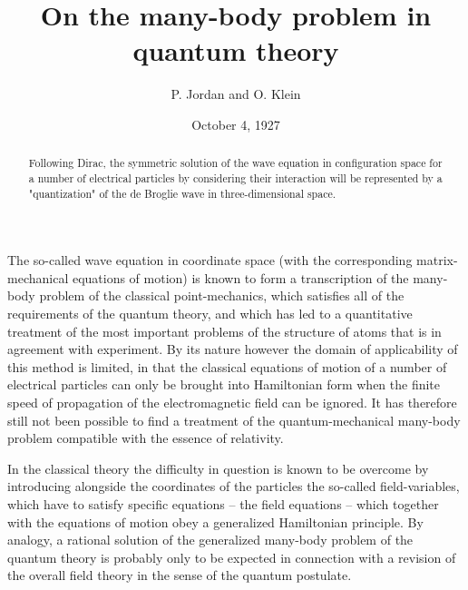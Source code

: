 \documentclass{article}
\title{On the many-body problem in quantum theory}
\author{P. Jordan and O. Klein}
\date{October 4, 1927}
\begin{document}
\maketitle

\begin{abstract}
Following Dirac, the symmetric solution of the wave equation in configuration space for a number of electrical particles by considering their interaction will be represented by a "quantization" of the de Broglie wave in three-dimensional space.
\end{abstract}

The so-called wave equation in coordinate space (with the corresponding matrix-mechanical equations of motion) is known to form a transcription of the many-body problem of the classical point-mechanics, which satisfies all of the requirements of the quantum theory, and which has led to a quantitative treatment of the most important problems of the structure of atoms that is in agreement with experiment. By its nature however the domain of applicability of this method is limited, in that the classical equations of motion of a number of electrical particles can only be brought into Hamiltonian form when the finite {speed of propagation} of the electromagnetic field can be ignored. It has therefore still not been possible to find a treatment of the quantum-mechanical many-body problem compatible with the essence of relativity. 

In the classical theory the difficulty in question is known to be overcome by introducing alongside the coordinates of the particles the so-called field-variables, which have to satisfy specific equations -- the field equations -- which together with the equations of motion obey a generalized Hamiltonian principle. By analogy, a rational solution of the generalized many-body problem of the quantum theory is probably only to be expected in connection with a revision of the overall field theory in the sense of the quantum postulate.
\end{document}
